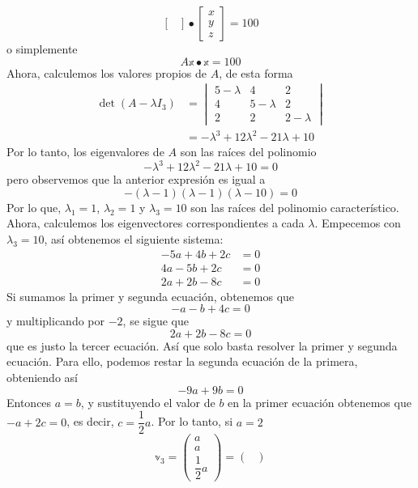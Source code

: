 \begin{example}
$$\begin{bmatrix}
    \end{bmatrix} \bullet \begin{bmatrix}
        x \\
        y \\
        z
    \end{bmatrix} = 100$$
    o simplemente
    $$A \mathbb{x} \bullet \mathbb{x} = 100$$
    Ahora, calculemos los valores propios de $A$, de esta forma
    \begin{align*}
        \operatorname{det} (A - \lambda I_3) & = \begin{vmatrix}
            5 - \lambda & 4 & 2 \\
            4 & 5 - \lambda & 2 \\
            2 & 2 & 2 - \lambda
        \end{vmatrix} \\
        & = - \lambda^3 + 12\lambda^2 - 21\lambda + 10
    \end{align*}\newpage\noindent
    Por lo tanto, los eigenvalores de $A$ son las raíces del polinomio
    $$- \lambda^3 + 12\lambda^2 - 21\lambda + 10 = 0$$
    pero observemos que la anterior expresión es igual a
    $$-(\lambda - 1)(\lambda - 1)(\lambda - 10) = 0$$
    Por lo que, $\lambda_1 = 1$, $\lambda_2 = 1$ y $\lambda_3 = 10$ son las raíces del polinomio característico. Ahora, calculemos los eigenvectores correspondientes a cada $\lambda$. Empecemos con $\lambda_3 = 10$, así obtenemos el siguiente sistema:
    \begin{align*}
        - 5a + 4b + 2c & = 0 \\
        4a - 5b + 2c & = 0 \\
        2a + 2b - 8c & = 0
    \end{align*}
    Si sumamos la primer y segunda ecuación, obtenemos que
    $$-a - b + 4c = 0$$
    y multiplicando por $-2$, se sigue que
    $$2a + 2b - 8c = 0$$
    que es justo la tercer ecuación. Así que solo basta resolver la primer y segunda ecuación. Para ello, podemos restar la segunda ecuación de la primera, obteniendo así
    $$-9a + 9b = 0$$
    Entonces $a = b$, y sustituyendo el valor de $b$ en la primer ecuación obtenemos que $-a + 2c = 0$, es decir, $c = \dfrac{1}{2}a$. Por lo tanto, si $a = 2$
    $$\mathbb{v}_3 = \begin{pmatrix}
        a \\
        a \\[2mm]
        \dfrac{1}{2}a
    \end{pmatrix} = \begin{pmatrix}

\end{pmatrix}$$
\end{example}

